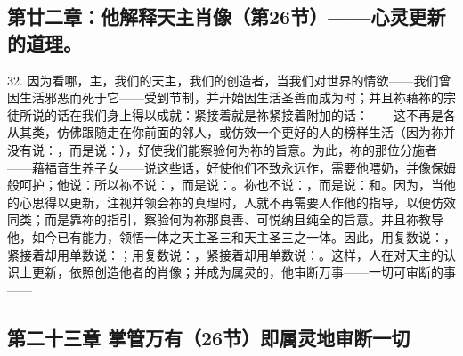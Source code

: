 
\subsection{第廿二章：他解释天主肖像（第26节）——心灵更新的道理。}

32. 因为看哪，主，我们的天主，我们的创造者，当我们对世界的情欲——我们曾因生活邪恶而死于它——受到节制，并开始因生活圣善而成为时；并且祢藉祢的宗徒所说的话在我们身上得以成就：紧接着就是祢紧接着附加的话：——这不再是各从其类，仿佛跟随走在你前面的邻人，或仿效一个更好的人的榜样生活（因为祢并没有说：，而是说：），好使我们能察验何为祢的旨意。为此，祢的那位分施者——藉福音生养子女——说这些话，好使他们不致永远作，需要他喂奶，并像保姆般呵护；他说：所以祢不说：，而是说：。祢也不说：，而是说：和。因为，当他的心思得以更新，注视并领会祢的真理时，人就不再需要人作他的指导，以便仿效同类；而是靠祢的指引，察验何为祢那良善、可悦纳且纯全的旨意。并且祢教导他，如今已有能力，领悟一体之天主圣三和天主圣三之一体。因此，用复数说：，紧接着却用单数说：；用复数说：，紧接着却用单数说：。这样，人在对天主的认识上更新，依照创造他者的肖像；并成为属灵的，他审断万事——一切可审断的事——\par


\subsection{第二十三章 掌管万有（26节）即属灵地审断一切}

